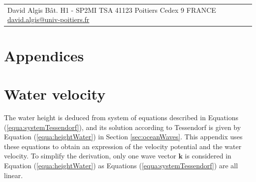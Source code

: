 \documentclass[final]{jcgt}
\begin{document}
\hspace{-2mm}
\begin{tabular}{p{}p{}}
	David Algis\newline
	Bât. H1 - SP2MI\newline
	TSA 41123\newline
	86073 Poitiers Cedex 9\newline
	FRANCE\newline
	\href{mailto:david.algis@univ-poitiers.fr}{david.algis@univ-poitiers.fr}
\end{tabular}

\appendix

\section*{Appendices}
\section{Water velocity}
\label{sec:annexe}
The water height is deduced from system of equations described in Equations (\ref{equa:systemTessendorf}), and its solution according to Tessendorf is given by Equation (\ref{equa:heightWater}) in Section \ref{sec:oceanWaves}.
This appendix uses these equations to obtain an expression of the velocity potential and the water velocity.
To simplify the derivation, only one wave vector $\mathbf{k}$ is considered in Equation (\ref{equa:heightWater}) as Equations (\ref{equa:systemTessendorf}) are all linear.
\end{document}
